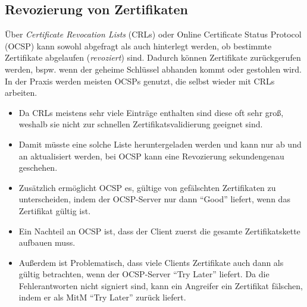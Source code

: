 		\subsection{Revozierung von Zertifikaten}
			Über \textit{Certificate Revocation Lists} (CRLs) oder Online Certificate Status Protocol (OCSP) kann sowohl abgefragt als auch hinterlegt werden, ob bestimmte Zertifikate abgelaufen (\textit{revoziert}) sind. Dadurch können Zertifikate zurückgerufen werden, bspw. wenn der geheime Schlüssel abhanden kommt oder gestohlen wird. In der Praxis werden meisten OCSPs genutzt, die selbst wieder mit CRLs arbeiten.

			\begin{itemize}
				\item Da CRLs meistens sehr viele Einträge enthalten sind diese oft sehr groß, weshalb sie nicht zur schnellen Zertifikatsvalidierung geeignet sind.
				\item Damit müsste eine solche Liste heruntergeladen werden und kann nur ab und an aktualisiert werden, bei OCSP kann eine Revozierung sekundengenau geschehen.
				\item Zusätzlich ermöglicht OCSP es, gültige von gefälschten Zertifikaten zu unterscheiden, indem der OCSP-Server nur dann \enquote{Good} liefert, wenn das Zertifikat gültig ist.
				\item Ein Nachteil an OCSP ist, dass der Client zuerst die gesamte Zertifikatskette aufbauen muss.
				\item Außerdem ist Problematisch, dass viele Clients Zertifikate auch dann als gültig betrachten, wenn der OCSP-Server \enquote{Try Later} liefert. Da die Fehlerantworten nicht signiert sind, kann ein Angreifer ein Zertifikat fälschen, indem er als MitM \enquote{Try Later} zurück liefert.
			\end{itemize}


